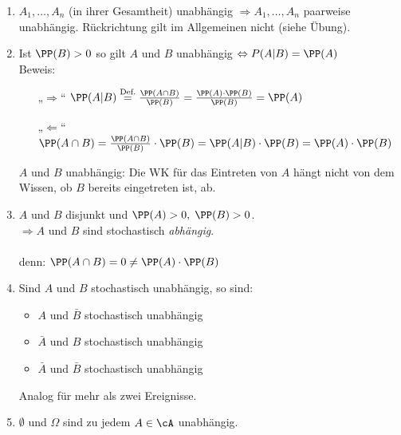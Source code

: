 \begin{enumerate}
\item $A_1, \dots , A_n$ (in ihrer Gesamtheit) unabhängig $\Rightarrow A_1, \dots , A_n$ paarweise unabhängig. Rückrichtung gilt im Allgemeinen nicht (siehe Übung).
\item Ist $\PP(B) >0$ so gilt $A$ und $B$ unabhängig $\Leftrightarrow P(A|B) = \PP(A)$\\
Beweis:
\begin{itemize}
\item[„$\Rightarrow$“]
$\PP(A|B) \overset{\text{Def.}}{=}\frac{\PP(A\cap B)}{\PP(B)}=\frac{\PP(A) \cdot \PP(B)}{\PP(B)}=\PP(A)$
\item[„$\Leftarrow$“]
$\PP(A\cap B) = \frac{\PP(A \cap B)}{\PP(B)}\cdot \PP(B) = \PP(A|B) \cdot \PP(B) = \PP(A) \cdot \PP(B)$
\end{itemize}
$A$ und $B$ unabhängig: Die WK für das Eintreten von $A$ hängt nicht von dem Wissen, ob $B$ bereits eingetreten ist, ab.
\item $A$ und $B$ disjunkt und $\PP(A) > 0, \; \PP(B) >0$.\\
$\Rightarrow A$ und $B$ sind stochastisch \emph{abhängig}.\\
\\
denn: $\PP(A\cap B) = 0 \not = \PP(A) \cdot \PP(B)$
\item Sind $A$ und $B$ stochastisch unabhängig, so sind:
\begin{itemize}
\item $A$ und $\bar B$ stochastisch unabhängig
\item $\bar A$ und $B$ stochastisch unabhängig
\item $\bar A$ und $\bar B$ stochastisch unabhängig
\end{itemize}
Analog für mehr als zwei Ereignisse.
\item $\emptyset$ und $\Omega$ sind zu jedem $A \in \cA$ unabhängig.
\end{enumerate}

